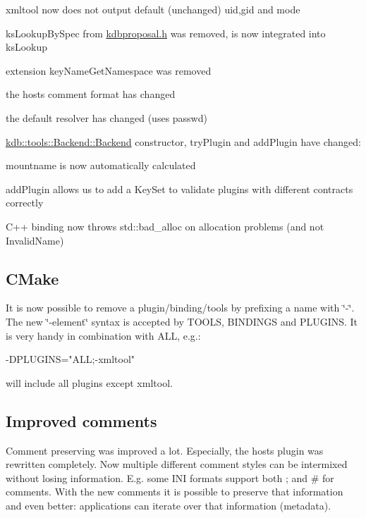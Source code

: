 \begin{DoxyItemize}
\item xmltool now does not output default (unchanged) uid,gid and mode
\item ks\+Lookup\+By\+Spec from \hyperlink{kdbproposal_8h}{kdbproposal.\+h} was removed, is now integrated into ks\+Lookup
\item extension key\+Name\+Get\+Namespace was removed
\item the hosts comment format has changed
\item the default resolver has changed (uses passwd)
\item \hyperlink{classkdb_1_1tools_1_1Backend_a1650b149ebf313ee8cd3472247212263}{kdb\+::tools\+::\+Backend\+::\+Backend} constructor, try\+Plugin and add\+Plugin have changed\+:
\item mountname is now automatically calculated
\item add\+Plugin allows us to add a Key\+Set to validate plugins with different contracts correctly
\item C++ binding now throws std\+::bad\+\_\+alloc on allocation problems (and not Invalid\+Name)
\end{DoxyItemize}

\subsection*{C\+Make}

It is now possible to remove a plugin/binding/tools by prefixing a name with \char`\"{}-\/\char`\"{}. The new \char`\"{}-\/element\char`\"{} syntax is accepted by T\+O\+O\+LS, B\+I\+N\+D\+I\+N\+GS and P\+L\+U\+G\+I\+NS. It is very handy in combination with A\+LL, e.\+g.\+:


\begin{DoxyCode}
-DPLUGINS="ALL;-xmltool"
\end{DoxyCode}


will include all plugins except xmltool.

\subsection*{Improved comments}

Comment preserving was improved a lot. Especially, the hosts plugin was rewritten completely. Now multiple different comment styles can be intermixed without losing information. E.\+g. some I\+NI formats support both ; and \# for comments. With the new comments it is possible to preserve that information and even better\+: applications can iterate over that information (metadata).

